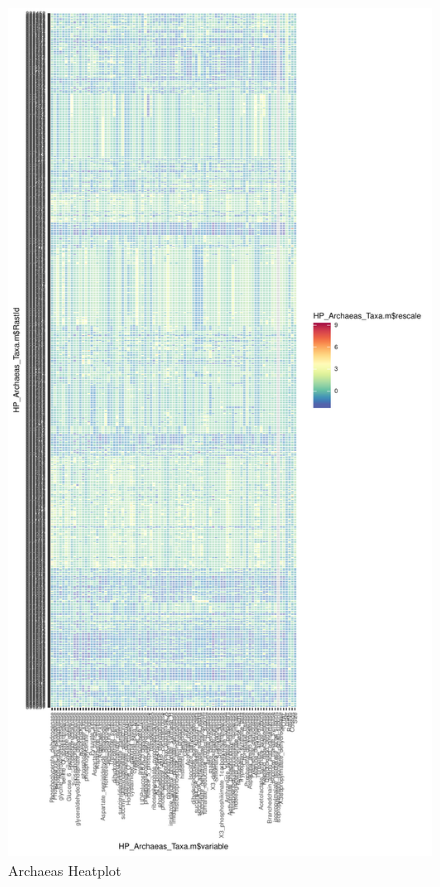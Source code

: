 \documentclass[12pt,twoside]{reedthesis}
\begin{document}
  \begin{figure}[h!tbp]
  \centering
  \includegraphics[angle = 0,scale = 0.6]{chapter3/ArchaeasHeatPlot.pdf}
  \caption[Archaeas Heatplot]{\normalsize{Archaeas Heatplot}}
  \label{fig:ArchaeaPlot}
  \end{figure}
  
\end{document}
